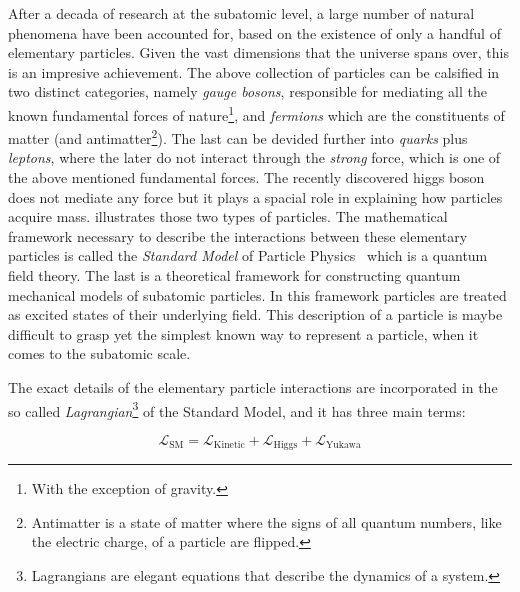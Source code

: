 After a decada of research at the subatomic level, a large number of natural phenomena have been accounted
for, based on the existence of only a handful of elementary particles. Given the vast dimensions that the
universe spans over, this is an impresive achievement. The above collection of particles can be calsified
in two distinct categories, namely {\it gauge bosons}, responsible for mediating all the known fundamental
forces of nature\footnote{With the exception of gravity.}, and {\it fermions} which are the constituents
of matter
(and antimatter\footnote{Antimatter is a state of matter where the signs of all quantum numbers, like the electric charge, of a particle are flipped.}).
The last can be devided further into {\it quarks} plus {\it leptons}, where the later do not interact through
the {\it strong} force, which is one of the above mentioned fundamental forces. The recently discovered higgs
boson~\cite{higgs-cms,higgs-atlas} does not mediate any force but it plays a spacial role in explaining how
particles acquire mass.  illustrates those two types of particles.
The mathematical framework necessary to describe the interactions between these elementary particles is called
the \textit{Standard Model} of Particle Physics~\cite{sm-glashow,sm-weinberg,sm-salam} which is a quantum field theory.
The last is a theoretical framework for constructing quantum mechanical models of subatomic particles.
In this framework particles are treated as excited states of their underlying field. This description of a
particle is maybe difficult to grasp yet the simplest known way to represent a particle, when it comes to the subatomic scale.


The exact details of the elementary particle interactions are incorporated in the so called
{\it Lagrangian}\footnote{ Lagrangians are elegant equations that describe the dynamics of a system.} of the Standard Model,
and it has three main terms:

\begin{equation}
\mathscr{L}_{\text{SM}} =
\mathscr{L}_{\text{Kinetic}} + \mathscr{L}_{\text{Higgs}} + \mathscr{L}_{\text{Yukawa}}
\label{lagrangian}
\end{equation}

